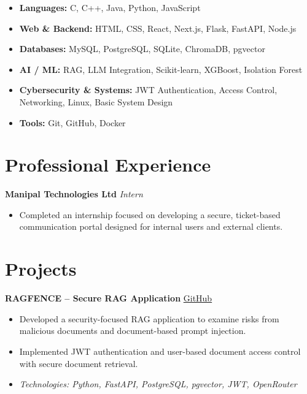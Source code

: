 \documentclass[10pt,a4paper]{article}
\begin{document}
\begin{itemize}
    \item \textbf{Languages:} C, C++, Java, Python, JavaScript

    \item \textbf{Web \& Backend:} HTML, CSS, React,
    Next.js, Flask, FastAPI, Node.js

    \item \textbf{Databases:} MySQL, PostgreSQL,
    SQLite, ChromaDB, pgvector

    \item \textbf{AI / ML:} RAG, LLM Integration,
    Scikit-learn, XGBoost, Isolation Forest

    \item \textbf{Cybersecurity \& Systems:}
    JWT Authentication, Access Control, Networking,
    Linux, Basic System Design

    \item \textbf{Tools:} Git, GitHub, Docker
\end{itemize}

\section*{Professional Experience}

\noindent
\textbf{Manipal Technologies Ltd}
\hfill \textit{Intern}

\begin{itemize}
    \item Completed an internship focused on developing
    a secure, ticket-based communication portal designed
    for internal users and external clients.
\end{itemize}

\section*{Projects}

\noindent
\textbf{RAGFENCE -- Secure RAG Application}
\hfill
\href{https://github.com/PranavBShenoy/RAGFENCE-}{GitHub}

\begin{itemize}
    \item Developed a security-focused RAG application
    to examine risks from malicious documents and
    document-based prompt injection.
    \item Implemented JWT authentication and
    user-based document access control with secure
    document retrieval.
    \item \textit{Technologies: Python, FastAPI,
    PostgreSQL, pgvector, JWT, OpenRouter}
\end{itemize}
\end{document}
